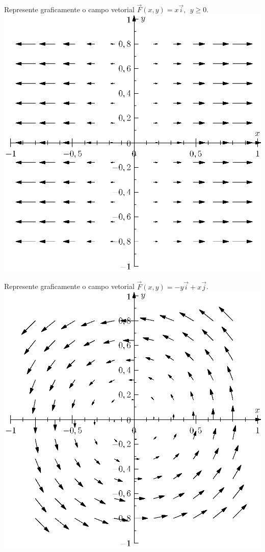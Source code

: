 \begin{ex} Represente graficamente o campo vetorial $\vec{F}(x,y)=x\vec{i},~~y\geq 0$.
\includegraphics{cap_campos/figs/campo_exemplo_2}
\end{ex}

\begin{ex} Represente graficamente o campo vetorial $\vec{F}(x,y)=-y\vec{i}+x\vec{j}$.
\includegraphics{cap_campos/figs/campo_exemplo_3}
\end{ex}

